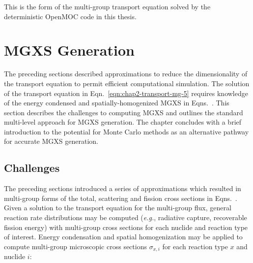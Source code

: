 
\noindent This is the form of the multi-group transport equation solved by the deterministic OpenMOC code in this thesis. 


\section{MGXS Generation}
\label{sec:chap2-mgxs-lib}

The preceding sections described approximations to reduce the dimensionality of the transport equation to permit efficient computational simulation. The solution of the transport equation in Eqn.~\ref{eqn:chap2-transport-mg-5} requires knowledge of the energy condensed and spatially-homogenized \ac{MGXS} in Eqns.~. This section describes the challenges to computing \ac{MGXS} and outlines the standard multi-level approach for \ac{MGXS} generation. The chapter concludes with a brief introduction to the potential for Monte Carlo methods as an alternative pathway for accurate \ac{MGXS} generation.


\subsection{Challenges}
\label{subsec:chap2-mgxs-lib-challenges}

The preceding sections introduced a series of approximations which resulted in multi-group forms of the total, scattering and fission cross sections in Eqns.~. Given a solution to the transport equation for the multi-group flux, general reaction rate distributions may be computed (\textit{e.g.}, radiative capture, recoverable fission energy) with multi-group cross sections for each nuclide and reaction type of interest. Energy condensation and spatial homogenization may be applied to compute multi-group microscopic cross sections $\sigma_{x,i}$ for each reaction type $x$ and nuclide $i$:

